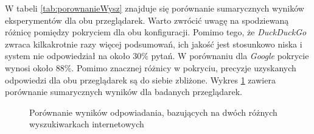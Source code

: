 W tabeli \ref{tab:porownanieWysz} znajduje się porównanie sumarycznych wyników eksperymentów dla obu przeglądarek. Warto zwrócić uwagę na spodziewaną różnicę pomiędzy pokryciem dla obu konfiguracji. Pomimo tego, że \textit{DuckDuckGo} zwraca kilkakrotnie razy więcej podsumowań, ich jakość jest stosunkowo niska i system nie odpowiedział na około $30\%$ pytań. W porównaniu dla \textit{Google} pokrycie wynosi około $88\%$. Pomimo znacznej różnicy w pokryciu, precyzje uzyskanych odpowiedzi dla obu przeglądarek są do siebie zbliżone. Wykres \ref{fig:porownanie-wyszukiwarek} zawiera porównanie sumarycznych wyników dla badanych przeglądarek.

\begin{figure}
        
        \caption{Porównanie wyników odpowiadania, bazujących na dwóch różnych wyszukiwarkach internetowych} \label{fig:porownanie-wyszukiwarek}
\end{figure}

